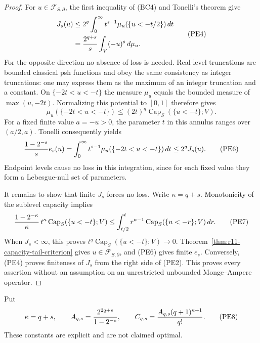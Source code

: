 \documentclass[11pt,a4paper]{article}
\numberwithin{equation}{section}
\theoremstyle{definition}
\theoremstyle{remark}
\begin{document}
\begin{proof}
For $u\in\mathcal F_{S,\partial}$, the first inequality of (BC4)
and Tonelli's theorem give
\[
 \begin{split}
 J_s(u)
 &\leq2^q\int_0^\infty t^{s-1}\mu_u(\{u<-t/2\})\,dt\\
 &= {2^{q+s}\over s}\int_V(-u)^s\,d\mu_u.
 \end{split}
 \tag{PE4}
\]
For the opposite direction no absence of loss is needed.
Real-level truncations are bounded classical psh functions and
obey the same consistency as integer truncations: one may express
them as the maximum of an integer truncation and a constant.
On $\{-2t<u<-t\}$ the measure $\mu_u$ equals the bounded
measure of $\max(u,-2t)$. Normalizing this potential to $[0,1]$
therefore gives
\[
       \mu_u(\{-2t<u<-t\})
          \leq(2t)^q\operatorname{Cap}_S(\{u<-t\};V).
 \tag{PE5}
\]
For a fixed finite value $a=-u>0$, the parameter $t$ in this
annulus ranges over $(a/2,a)$. Tonelli consequently yields
\[
 {1-2^{-s}\over s}e_s(u)
   =\int_0^\infty t^{s-1}
                 \mu_u(\{-2t<u<-t\})\,dt
   \leq2^qJ_s(u).
 \tag{PE6}
\]
Endpoint levels cause no loss in this integration, since for each
fixed value they form a Lebesgue-null set of parameters.

It remains to show that finite $J_s$ forces no loss. Write
$\kappa=q+s$. Monotonicity of the sublevel capacity implies
\[
 {1-2^{-\kappa}\over\kappa}\,
       t^\kappa\operatorname{Cap}_S(\{u<-t\};V)
 \leq\int_{t/2}^t r^{\kappa-1}
                 \operatorname{Cap}_S(\{u<-r\};V)\,dr.
 \tag{PE7}
\]
When $J_s<\infty$, this proves
$t^q\operatorname{Cap}_S(\{u<-t\};V)\to0$.
Theorem~\ref{thm:r11-capacity-tail-criterion} gives
$u\in\mathcal F_{S,\partial}$, and (PE6) gives finite $e_s$.
Conversely, (PE4) proves finiteness of $J_s$ from the right side
of (PE2). This proves every assertion without an assumption on
an unrestricted unbounded Monge--Ampere operator.
\end{proof}

Put
\[
 \kappa=q+s,\qquad
 A_{q,s}={2^{2q+s}\over1-2^{-s}},\qquad
 C_{q,s}={A_{q,s}(q+1)^{\kappa+1}\over q!}.
 \tag{PE8}
\]
These constants are explicit and are not claimed optimal.
\end{document}
